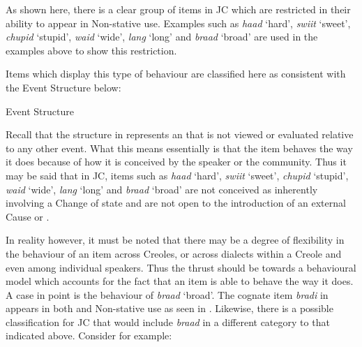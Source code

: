 \z
 \z

As shown here, there is a clear group of items in JC which are restricted in their ability to appear in Non-stative use. Examples such as \textit{haad} `hard', \textit{swiit} `sweet', \textit{chupid} `stupid', \textit{waid} `wide', \textit{lang} `long' and \textit{braad} `broad' are used in the examples above to show this restriction.

Items which display this type of behaviour are classified here as  consistent with the Event Structure below: 

\ea%
\label{ex:5:18}
 Event Structure \citep[56]{Pustejovsky1991}
\begin{center}
\fbox{\parbox{3cm}{\centering
\begin{forest} [S [e]] \end{forest}}}
\end{center}
\z  
 
Recall that the structure in  represents an  that is not viewed or evaluated relative to any other event. What this means essentially is that the item behaves the way it does because of how it is conceived by the speaker or the community. Thus it may be said that in JC, items such as \textit{haad} `hard', \textit{swiit} `sweet', \textit{chupid} `stupid', \textit{waid}  `wide’, \textit{lang} `long' and \textit{braad} `broad' are not conceived as inherently involving a Change of state and are not open to the introduction of an external Cause or . 

In reality however, it must be noted that there may be a degree of flexibility in the behaviour of an item across Creoles, or across dialects within a Creole and even among individual speakers. Thus the thrust should be towards a behavioural model which accounts for the fact that an item is able to behave the way it does. A case in point is the behaviour of \textit{braad} ‘broad’. The cognate item \textit{bradi} in  appears in both  and Non-stative use as seen in . Likewise, there is a possible classification for JC that would include \textit{braad} in a different category to that indicated above. Consider  for example:\largerpage

